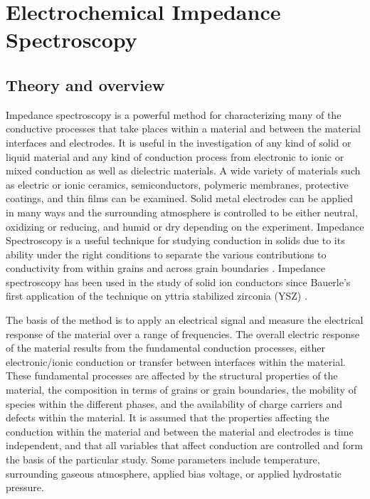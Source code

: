 \vspace{12pt}
\section{Electrochemical Impedance Spectroscopy}

\subsection{Theory and overview}

Impedance spectroscopy is a powerful method for characterizing many of the conductive processes that take places within a material and between the material interfaces and electrodes. It is useful in the investigation of any kind of solid or liquid material and any kind of conduction process from electronic to ionic or mixed conduction as well as dielectric materials. A wide variety of materials such as electric or ionic ceramics, semiconductors, polymeric membranes, protective coatings, and thin films can be examined. Solid metal electrodes can be applied in many ways and the surrounding atmosphere is controlled to be either neutral, oxidizing or reducing, and humid or dry depending on the experiment. Impedance Spectroscopy is a useful technique for studying conduction in solids due to its ability under the right conditions to separate the various contributions to conductivity from within grains and across grain boundaries \cite{Barsoukov2005}. Impedance spectroscopy has been used in the study of solid ion conductors since Bauerle's first application of the technique on yttria stabilized zirconia (YSZ) \cite{Bauerle1969}.

 The basis of the method is to apply an electrical signal and measure the electrical response of the material over a range of frequencies. The overall electric response of the material results from the fundamental conduction processes, either electronic/ionic conduction or transfer between interfaces within the material. These fundamental processes are affected by the structural properties of the material, the composition in terms of grains or grain boundaries, the mobility of species within the different phases, and the availability of charge carriers and defects within the material. It is assumed that the properties affecting the conduction within the material and between the material and electrodes is time independent, and that all variables that affect conduction are controlled and form the basis of the particular study. Some parameters include temperature, surrounding gaseous atmosphere, applied bias voltage, or applied hydrostatic pressure.
 

